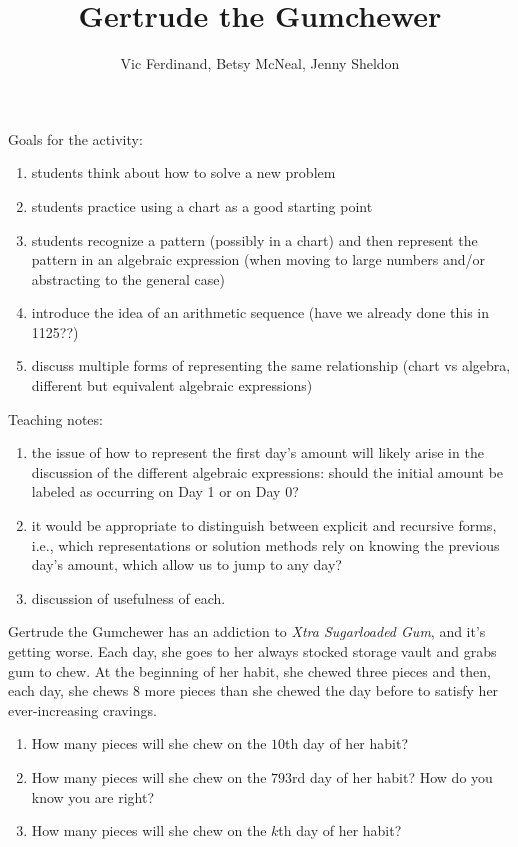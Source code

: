 \documentclass{ximera}
\title{Gertrude the Gumchewer}
\author{Vic Ferdinand, Betsy McNeal, Jenny Sheldon}
\begin{document}
\begin{abstract}
\end{abstract}
\maketitle

\begin{instructorIntro}
Goals for the activity:
\begin{enumerate}
\item students think about how to solve a new problem
\item students practice using a chart as a good starting point
\item  students recognize a pattern (possibly in a chart) and then represent the pattern in an algebraic expression (when moving to large numbers and/or abstracting to the general case)
\item  introduce the idea of an arithmetic sequence (have we already done this in 1125??)
\item discuss multiple forms of representing the same relationship (chart vs algebra, different but equivalent algebraic expressions)
\end{enumerate}

Teaching notes:
\begin{enumerate}
\item the issue of how to represent the first day's amount will likely arise in the discussion of the different algebraic expressions:  should the initial amount be labeled as occurring on Day 1 or on Day 0?
\item it would be appropriate to distinguish between explicit and recursive forms, i.e., which representations or solution methods rely on knowing the previous day's amount, which allow us to jump to any day?
\item discussion of usefulness of each.
\end{enumerate}
\end{instructorIntro}

\begin{problem}
Gertrude the Gumchewer has an addiction to \textit{Xtra Sugarloaded
  Gum}, and it's getting worse.  Each day, she goes to her always
stocked storage vault and grabs gum to chew.  At the beginning of her
habit, she chewed three pieces and then, each day, she chews 8 more
pieces than she chewed the day before to satisfy her ever-increasing
cravings.
\begin{enumerate}
\item How many pieces will she chew on the $10$th day of her habit?
\item How many pieces will she chew on the $793$rd day of her habit? How do you know you are right?
\item How many pieces will she chew on the $k$th day of her habit?
\end{enumerate}
\end{problem}
\end{document}
